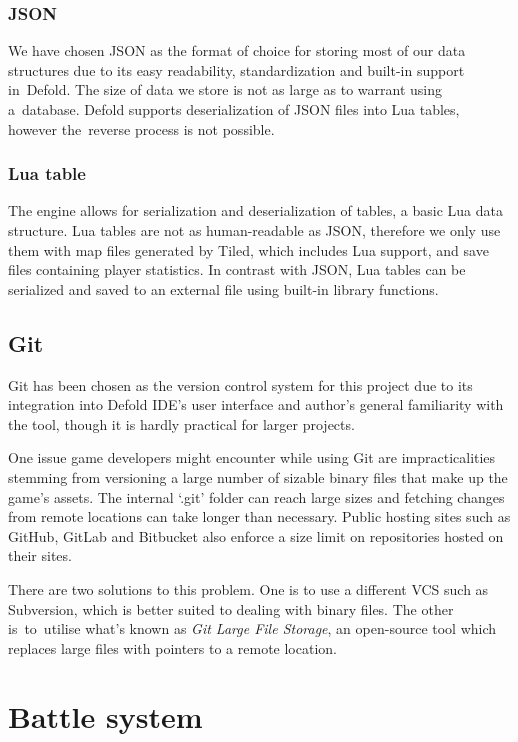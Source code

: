 \documentclass[thesis=B,english,hidelinks]{FITthesisXE}[2012/06/26]
\begin{document}
\subsection{JSON}

We have chosen JSON as the format of choice for storing most of our data structures due to its easy readability, standardization and built-in support in~Defold. The size of data we store is not as large as to warrant using a~database. Defold supports deserialization of JSON files into Lua tables, however the~reverse process is not possible.

\subsection{Lua table}

The engine allows for serialization and deserialization of tables, a basic Lua data structure. Lua tables are not as human-readable as JSON, therefore we only use them with map files generated by Tiled, which includes Lua support, and save files containing player statistics. In contrast with JSON, Lua tables can be serialized and saved to an external file using built-in library functions.

\section{Git}

Git has been chosen as the version control system for this project due to its integration into Defold IDE's user interface and author's general familiarity with the tool, though it is hardly practical for larger projects.

One issue game developers might encounter while using Git are impracticalities stemming from versioning a large number of sizable binary files that make up the game's assets. The internal `.git' folder can reach large sizes and fetching changes from remote locations can take longer than necessary. Public hosting sites such as GitHub, GitLab and Bitbucket also enforce a size limit on repositories hosted on their sites.

There are two solutions to this problem. One is to use a different VCS such as Subversion, which is better suited to dealing with binary files. The other is~to~utilise what's known as \emph{Git Large File Storage}\autocite{gitlfs}, an open-source tool which replaces large files with pointers to a remote location.

\chapter{Battle system}
\end{document}
